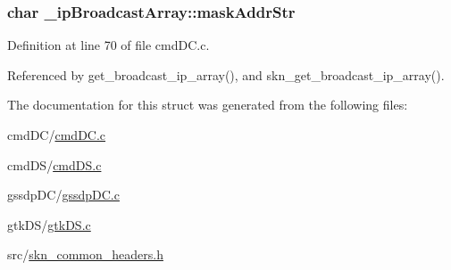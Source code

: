 \subsubsection[{\texorpdfstring{mask\+Addr\+Str}{maskAddrStr}}]{\setlength{\rightskip}{0pt plus 5cm}char \+\_\+ip\+Broadcast\+Array\+::mask\+Addr\+Str}\hypertarget{struct__ip_broadcast_array_a9241c1fbfb22a3ecfe4777863a063eb3}{}\label{struct__ip_broadcast_array_a9241c1fbfb22a3ecfe4777863a063eb3}


Definition at line 70 of file cmd\+D\+C.\+c.



Referenced by get\+\_\+broadcast\+\_\+ip\+\_\+array(), and skn\+\_\+get\+\_\+broadcast\+\_\+ip\+\_\+array().



The documentation for this struct was generated from the following files\+:\begin{DoxyCompactItemize}
\item 
cmd\+D\+C/\hyperlink{cmd_d_c_8c}{cmd\+D\+C.\+c}\item 
cmd\+D\+S/\hyperlink{cmd_d_s_8c}{cmd\+D\+S.\+c}\item 
gssdp\+D\+C/\hyperlink{gssdp_d_c_8c}{gssdp\+D\+C.\+c}\item 
gtk\+D\+S/\hyperlink{gtk_d_s_8c}{gtk\+D\+S.\+c}\item 
src/\hyperlink{skn__common__headers_8h}{skn\+\_\+common\+\_\+headers.\+h}\end{DoxyCompactItemize}
